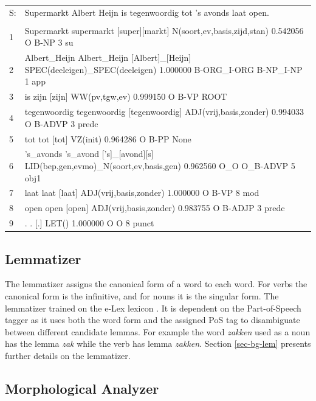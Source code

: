 \documentclass{book}
\begin{document}
\begin{tabular}{ll}
\label{ex_mwu}
\small
S: &Supermarkt Albert Heijn is tegenwoordig tot 's avonds laat open.\\
&\\
1 &	Supermarkt	supermarkt	[super][markt]	N(soort,ev,basis,zijd,stan)	0.542056	O	B-NP	3	su\\
2&	Albert\_Heijn	Albert\_Heijn	[Albert]\_[Heijn] SPEC(deeleigen)\_SPEC(deeleigen)	1.000000	B-ORG\_I-ORG	B-NP\_I-NP	1	app\\
3&	is	zijn	[zijn]	WW(pv,tgw,ev)	0.999150	O	B-VP	ROOT\\
4&	tegenwoordig	tegenwoordig	[tegenwoordig]	ADJ(vrij,basis,zonder)	0.994033	O	B-ADVP	3	predc\\
5&	tot	tot	[tot]	VZ(init)	0.964286	O	B-PP	None\\
6&	's\_avonds	's\_avond	['s]\_[avond][s]	LID(bep,gen,evmo)\_N(soort,ev,basis,gen)	0.962560	O\_O	O\_B-ADVP	5	obj1\\
7&	laat	laat	[laat]	ADJ(vrij,basis,zonder)	1.000000	O	B-VP	8	mod\\
8&	open	open	[open]	ADJ(vrij,basis,zonder)	0.983755	O	B-ADJP	3	predc\\
9&	.	.	[.]	LET()	1.000000	O	O	8	punct\\
\end{tabular}



\subsection{Lemmatizer}

The lemmatizer assigns the canonical form of a word to each word. For verbs
the canonical form is the infinitive, and for nouns it is the singular form.
The lemmatizer trained on the e-Lex lexicon \cite{e-lex}. It is dependent on
the Part-of-Speech tagger as it uses both the word form and the assigned PoS tag to
disambiguate between different candidate lemmas. For example the word {\it
zakken} used as a noun has the lemma {\it zak} while the verb has lemma {\it
zakken}.  Section \ref{sec-bg-lem} presents further details on the lemmatizer.


\subsection{Morphological Analyzer}
\end{document}
